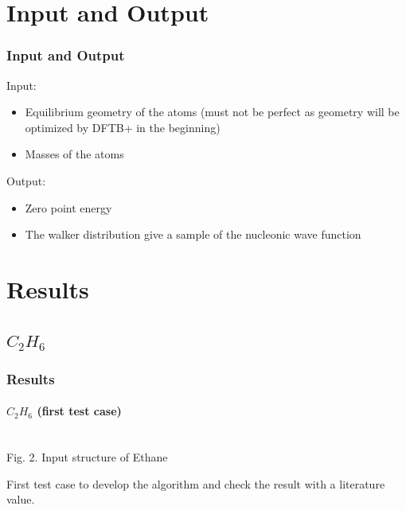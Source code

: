 \documentclass[16pt]{beamer}
\begin{document}
\section{Input and Output}
\begin{frame}
\frametitle{Input and Output}
Input:\\
\begin{itemize}
\item Equilibrium geometry of the atoms (must not be perfect as geometry will be optimized by DFTB+ in the beginning)
\item Masses of the atoms
\end{itemize}
Output:
\begin{itemize}
\item Zero point energy
\item The walker distribution give a sample of the nucleonic wave function
\end{itemize}
\end{frame}

\section{Results}

\subsection{$C_2 H_6$}
\begin{frame}
\frametitle{Results}
\framesubtitle{$C_2 H_6$ (first test case)}
\begin{center}
\\
Fig. 2. Input structure of Ethane
\end{center}
First test case to develop the algorithm and check the result with a literature value.
\end{frame}
\end{document}
